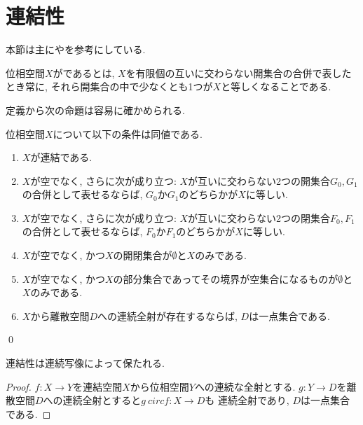 \documentclass[uplatex, dvipdfmx, a4paper, 12pt, class=jsbook, crop=false]{standalone}
\begin{document}
\section{連結性}
\label{sec:connected-spaces}

\begin{source}
	本節は主に\cite[Chapter 6]{Engelking1989GT}や\cite[第４章]{Morita1981ja}を参考にしている.
\end{source}

\begin{definition}
	位相空間$ X $がであるとは, $ X $を有限個の互いに交わらない開集合の合併で表したとき常に, それら開集合の中で少なくとも1つが$ X $と等しくなることである.
\end{definition}

定義から次の命題は容易に確かめられる.
\begin{proposition}
	\label{prop:Characterization of connectedness}
	位相空間$ X $について以下の条件は同値である.
		\begin{enumerate}
			\item $ X $が連結である.
			\item $ X $が空でなく, さらに次が成り立つ: $ X $が互いに交わらない2つの開集合$ G_0, G_1 $の合併として表せるならば,
			      $ G_0 $か$ G_1 $のどちらかが$ X $に等しい.
			\item $ X $が空でなく, さらに次が成り立つ: $ X $が互いに交わらない2つの閉集合$ F_0, F_1 $の合併として表せるならば,
			$ F_0 $か$ F_1 $のどちらかが$ X $に等しい.
			\item $ X $が空でなく, かつ$ X $の開閉集合が$ \emptyset $と$ X $のみである.
			\item $ X $が空でなく, かつ$ X $の部分集合であってその境界が空集合になるものが$ \emptyset $と$ X $のみである.
			\item $ X $から離散空間$ D $への連続全射が存在するならば, $ D $は一点集合である.
		\end{enumerate}
		\qed
\end{proposition}

\begin{proposition}
	\label{prop:Continuous maps preserve connectedness}
	連結性は連続写像によって保たれる.
\end{proposition}

\begin{proof}
	$ f \colon X \to Y $を連結空間$ X $から位相空間$ Y $への連続な全射とする.
	$ g \colon Y \to D $を離散空間$ D $への連続全射とすると$ g\ circ f \colon X \to D $も
	連続全射であり, $ D $は一点集合である.
\end{proof}
\end{document}
